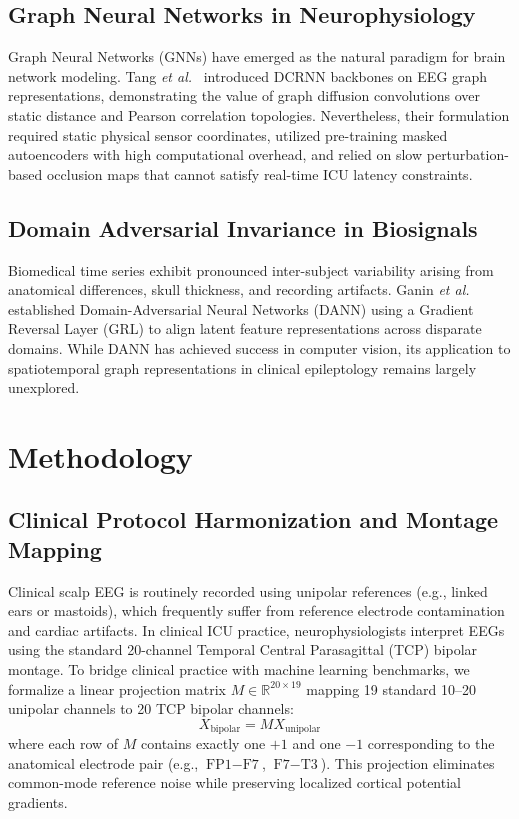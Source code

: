 \documentclass[journal]{IEEEtran}
\begin{document}
\subsection{Graph Neural Networks in Neurophysiology}
Graph Neural Networks (GNNs) have emerged as the natural paradigm for brain network modeling. Tang \textit{et al.}~\cite{tang2022self} introduced DCRNN backbones on EEG graph representations, demonstrating the value of graph diffusion convolutions over static distance and Pearson correlation topologies. Nevertheless, their formulation required static physical sensor coordinates, utilized pre-training masked autoencoders with high computational overhead, and relied on slow perturbation-based occlusion maps that cannot satisfy real-time ICU latency constraints.

\subsection{Domain Adversarial Invariance in Biosignals}
Biomedical time series exhibit pronounced inter-subject variability arising from anatomical differences, skull thickness, and recording artifacts. Ganin \textit{et al.}~\cite{ganin2016domain} established Domain-Adversarial Neural Networks (DANN) using a Gradient Reversal Layer (GRL) to align latent feature representations across disparate domains. While DANN has achieved success in computer vision, its application to spatiotemporal graph representations in clinical epileptology remains largely unexplored.

\section{Methodology}

\subsection{Clinical Protocol Harmonization and Montage Mapping}
Clinical scalp EEG is routinely recorded using unipolar references (e.g., linked ears or mastoids), which frequently suffer from reference electrode contamination and cardiac artifacts. In clinical ICU practice, neurophysiologists interpret EEGs using the standard 20-channel Temporal Central Parasagittal (TCP) bipolar montage. To bridge clinical practice with machine learning benchmarks, we formalize a linear projection matrix $M \in \mathbb{R}^{20 \times 19}$ mapping 19 standard 10--20 unipolar channels to 20 TCP bipolar channels:
\begin{equation}
X_{\text{bipolar}} = M X_{\text{unipolar}}
\end{equation}
where each row of $M$ contains exactly one $+1$ and one $-1$ corresponding to the anatomical electrode pair (e.g., $\text{FP1}-\text{F7}$, $\text{F7}-\text{T3}$). This projection eliminates common-mode reference noise while preserving localized cortical potential gradients.
\end{document}
